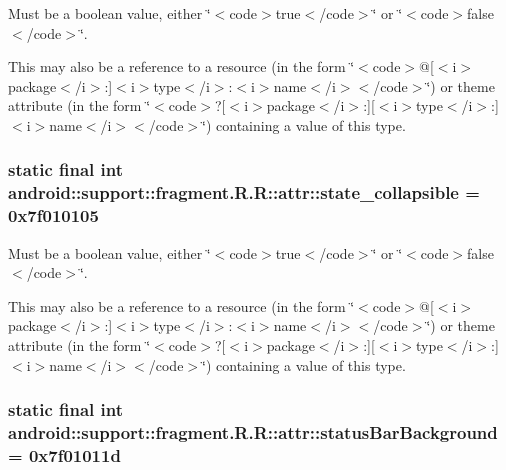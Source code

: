 Must be a boolean value, either \char`\"{}$<$code$>$true$<$/code$>$\char`\"{} or \char`\"{}$<$code$>$false$<$/code$>$\char`\"{}. 

This may also be a reference to a resource (in the form \char`\"{}$<$code$>$@\mbox{[}$<$i$>$package$<$/i$>$:\mbox{]}$<$i$>$type$<$/i$>$:$<$i$>$name$<$/i$>$$<$/code$>$\char`\"{}) or theme attribute (in the form \char`\"{}$<$code$>$?\mbox{[}$<$i$>$package$<$/i$>$:\mbox{]}\mbox{[}$<$i$>$type$<$/i$>$:\mbox{]}$<$i$>$name$<$/i$>$$<$/code$>$\char`\"{}) containing a value of this type. \hypertarget{classandroid_1_1support_1_1fragment_1_1_r_1_1attr_abb898ec289aba2620f74cb8cfca6452}{
\subsubsection[{state\_\-collapsible}]{\setlength{\rightskip}{0pt plus 5cm}static final int android::support::fragment.R.R::attr::state\_\-collapsible = 0x7f010105}}
\label{classandroid_1_1support_1_1fragment_1_1_r_1_1attr_abb898ec289aba2620f74cb8cfca6452}


Must be a boolean value, either \char`\"{}$<$code$>$true$<$/code$>$\char`\"{} or \char`\"{}$<$code$>$false$<$/code$>$\char`\"{}. 

This may also be a reference to a resource (in the form \char`\"{}$<$code$>$@\mbox{[}$<$i$>$package$<$/i$>$:\mbox{]}$<$i$>$type$<$/i$>$:$<$i$>$name$<$/i$>$$<$/code$>$\char`\"{}) or theme attribute (in the form \char`\"{}$<$code$>$?\mbox{[}$<$i$>$package$<$/i$>$:\mbox{]}\mbox{[}$<$i$>$type$<$/i$>$:\mbox{]}$<$i$>$name$<$/i$>$$<$/code$>$\char`\"{}) containing a value of this type. \hypertarget{classandroid_1_1support_1_1fragment_1_1_r_1_1attr_f510492c4521b799e557d0ecf1b6ec1d}{
\subsubsection[{statusBarBackground}]{\setlength{\rightskip}{0pt plus 5cm}static final int android::support::fragment.R.R::attr::statusBarBackground = 0x7f01011d}}
\label{classandroid_1_1support_1_1fragment_1_1_r_1_1attr_f510492c4521b799e557d0ecf1b6ec1d}


